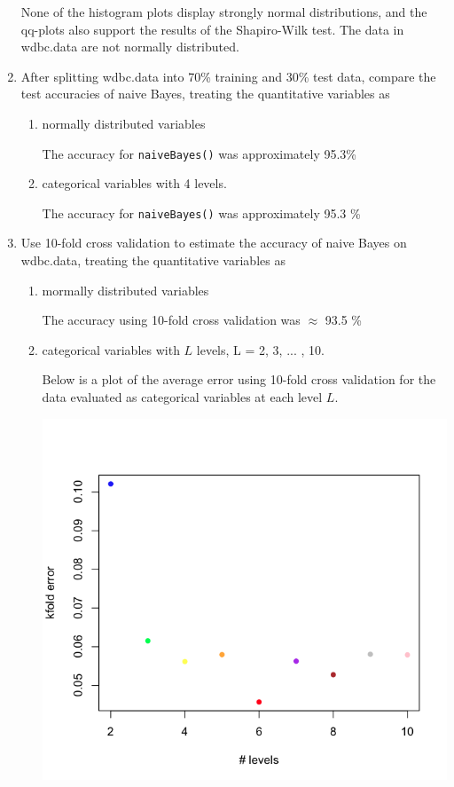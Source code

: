 \documentclass[11pt]{article}
\begin{document}
\begin{enumerate}
None of the histogram plots display strongly normal distributions, and the qq-plots also support the 
results of the Shapiro-Wilk test. The data in wdbc.data are not normally distributed. 

\item After splitting wdbc.data into 70\% training and 30\% test 
      data, compare the test accuracies of naive Bayes, treating
      the quantitative variables as 
  \begin{enumerate}
    \item normally distributed variables

          The accuracy for \verb|naiveBayes()| was approximately 95.3\%

    \item categorical variables with 4 levels. 

          The accuracy for \verb|naiveBayes()| was approximately 95.3 \%
  \end{enumerate}

\item Use 10-fold cross validation to estimate the accuracy of naive Bayes on wdbc.data, 
treating the quantitative variables as 

  \begin{enumerate}
    \item mormally distributed variables

          The accuracy using 10-fold cross validation was $\approx$ 93.5 \%

    \item categorical variables with $L$ levels, L = 2, 3, ... , 10.

          Below is a plot of the average error using 10-fold cross validation for the data evaluated as 
          categorical variables at each level $L$. 
          
          \begin{center}
          \includegraphics[scale=0.35]{pix/err_k10_cat}
          \end{center}


\end{enumerate}
\end{enumerate}
\end{document}
